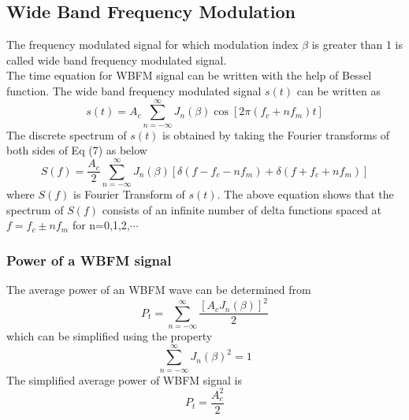 \documentclass[12pt,a4paper]{article}%
\begin{document}
\begin{flushleft}
	\subsection{Wide Band Frequency Modulation}
	The frequency modulated signal for which modulation index $\beta$ is greater than 1 is called wide band frequency modulated signal.\\
	The time equation for WBFM signal can be written with the help of Bessel function. The wide band frequency modulated signal $s(t)$ can be written as 
	\begin{equation}
	s(t)= A_c \sum \limits_{n=-\infty}^\infty J_n(\beta) \cos{[2\pi(f_c+nf_m)t]}
	\end{equation}
	The discrete spectrum of $s(t)$ is obtained by taking the Fourier transforms of both sides of Eq (7) as below
	\begin{equation}
	S(f)= \frac{A_c}{2} \sum \limits_{n=-\infty}^\infty J_n(\beta)[ \delta(f-f_c-nf_m)+\delta(f+f_c+nf_m) ]
	\end{equation}
	where $S(f)$ is Fourier Transform of $s(t)$. The above equation shows that the spectrum of $S(f)$ consists of an infinite number of delta functions spaced at $f=f_c\pm nf_m$ for n=0,1,2,$\cdots$
	\subsubsection{Power of a WBFM signal}
	The average power of an WBFM wave can be determined from
	\begin{equation}
	P_t= \sum \limits_{n=-\infty}^\infty \frac{[{A_cJ_n(\beta)}]^2}{2}
	\end{equation}
	which can be simplified using the property
	$$\sum \limits_{n=-\infty}^\infty J_n(\beta)^2=1$$
	The simplified average power of WBFM signal is
	\begin{equation}
	P_t= \frac{A_c^2}{2}
	\end{equation}
	

\end{flushleft}
\end{document}
